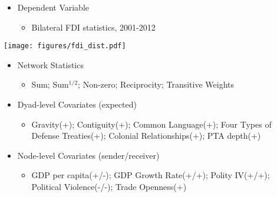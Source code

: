 \documentclass[landscape,a0paper,fontscale=0.285]{baposter} %
\newcommand{\compresslist}{ %
\setlength{\itemsep}{1pt}
\setlength{\parskip}{0pt}
\setlength{\parsep}{0pt}
}
\begin{document}
\begin{poster}
{\begin{itemize}[leftmargin=4mm]\compresslist

\item{Dependent Variable}
\begin{itemize}
\item{Bilateral FDI statistics, 2001-2012}
\end{itemize}
\end{itemize}
\vspace*{-\baselineskip}
\texttt{[image: figures/fdi\_dist.pdf]}
\vspace*{-\baselineskip}
\begin{itemize}[leftmargin=4mm]\compresslist
\item{Network Statistics}
\begin{itemize}
\item{Sum; Sum$^{1/2}$; Non-zero; Reciprocity; Transitive Weights}
\end{itemize}
\item{Dyad-level Covariates (expected)}
\begin{itemize}
\item{Gravity(+); Contiguity(+); Common Language(+); Four Types of Defense Treaties(+); Colonial Relationships(+); PTA depth(+)}
\end{itemize}
\item{Node-level Covariates (sender/receiver)}
\begin{itemize}
\item{GDP per capita(+/-); GDP Growth Rate(+/+); Polity IV(+/+); Political Violence(-/-); Trade Openness(+)}
\end{itemize}
\end{itemize}



}


\end{poster}
\end{document}
